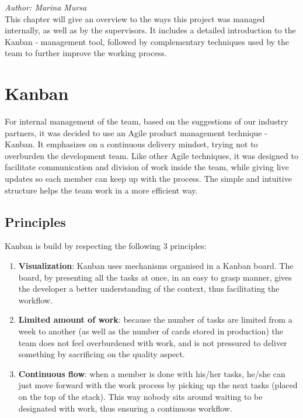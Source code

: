 \textit{Author: Marina Mursa} \\
   This chapter will give an overview to the ways this project was managed internally, as well as by the supervisors. It includes a detailed introduction to the Kanban - management tool, followed by complementary techniques used by the team to further improve the working process.
    \section{Kanban}
For internal management of the team, based on the suggestions of our industry partners, it was decided to use an Agile product management technique - Kanban. It emphasizes on a continuous delivery mindset, trying not to overburden the development team. Like other Agile techniques, it was designed to facilitate communication and division of work inside the team, while giving live updates so each member can keep up with the process. The simple and intuitive structure helps the team work in a more efficient way.
        \subsection{Principles}
        Kanban is build by respecting the following 3 principles:
            \begin{enumerate}
  \item \textbf{Visualization}: Kanban uses mechanisms organised in a Kanban board. The board, by presenting all the tasks at once, in an easy to grasp manner, gives the developer a better understanding of the context, thus facilitating the workflow.
  \item \textbf{Limited amount of work}: because the number of tasks are limited from a week to another (as well as the number of cards stored in production) the team does not feel overburdened with work, and is not pressured to deliver something by sacrificing on the quality aspect.
  \item \textbf{Continuous flow}: when a member is done with his/her tasks, he/she can just move forward with the work process by picking up the next tasks (placed on the top of the stack). This way nobody sits around waiting to be designated with work, thus ensuring a continuous workflow.
\end{enumerate}
